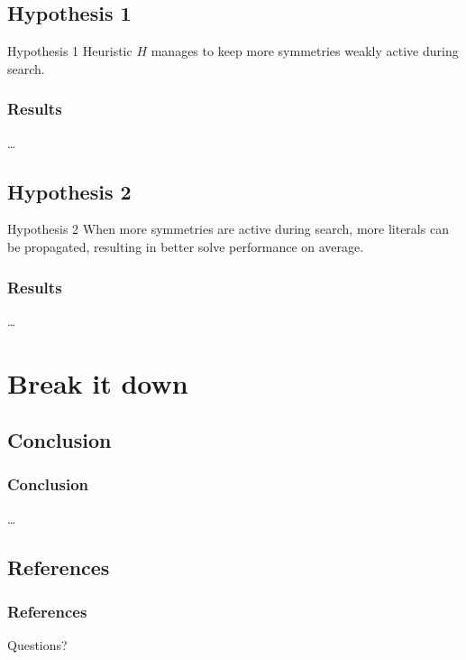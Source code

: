 \documentclass{beamer}
\begin{document}
	\subsection{Hypothesis 1}
	\begin{frame}
		\begin{block}{Hypothesis 1}
			\label{hyp:increased_activity}
			Heuristic $H$ manages to keep more symmetries weakly active during search.
		\end{block}
	\end{frame}
	
	\begin{frame}
		\frametitle{Results}
		\ldots
	\end{frame}
	
	\subsection{Hypothesis 2}
	\begin{frame}
		\begin{block}{Hypothesis 2}
			\label{hyp:activity_equals_speed}
			When more symmetries are active during search, more literals can be propagated, resulting in
			better solve performance on average.
		\end{block}
	\end{frame}
	
	\begin{frame}
		\frametitle{Results}
		\ldots
	\end{frame}
	
	
\section{Break it down}

	\subsection{Conclusion}
	\begin{frame}
		\frametitle{Conclusion}
		\ldots
	\end{frame}

	\subsection{References}
	\begin{frame}[allowframebreaks]
		\frametitle{References}
		
		
	\end{frame}

	\begin{frame}
	\Huge{\centerline{Questions?}}
	\end{frame}
\end{document}
